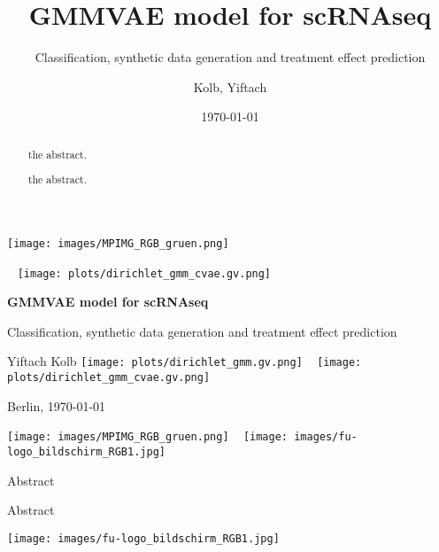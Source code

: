 \documentclass[final]{beamer}
\title{GMMVAE model for scRNAseq}
\subtitle{Classification, synthetic data generation and treatment effect
prediction}
\author{Kolb, Yiftach}
\institute[FU and MPG]{
\centering
\vfill
{\texttt{[image: images/MPIMG\_RGB\_gruen.jpg]}} %
\hspace{0.3cm}
{\texttt{[image: images/fu-logo\_bildschirm\_RGB1.jpg]}}
}
\date{\today}
\begin{document}
\begin{frame}[t]
\begin{center}
\texttt{[image: images/MPIMG\_RGB\_gruen.png]}\\

\begin{block}

~ \texttt{[image: plots/dirichlet\_gmm\_cvae.gv.png]}

\Large
\textbf{GMMVAE model for scRNAseq
}
\vspace{0.5cm}


\large
Classification, synthetic data generation and treatment effect
prediction 

\vspace{1.0cm}

Yiftach Kolb
\texttt{[image: plots/dirichlet\_gmm.gv.png]}
~
\texttt{[image: plots/dirichlet\_gmm\_cvae.gv.png]}

Berlin, \today

\end{block}

\texttt{[image: images/MPIMG\_RGB\_gruen.png]}
~
\texttt{[image: images/fu-logo\_bildschirm\_RGB1.jpg]}
\end{center}

\begin{block}{Abstract}
\begin{abstract}
the abstract.
\end{abstract}
\end{block}
\end{frame}

\begin{frame}[t]
\begin{block}
\maketitle
\end{block}
\begin{block}{Abstract}
\begin{abstract}
the abstract.
\end{abstract}
\end{block}
\begin{block}

\end{block}
\texttt{[image: images/fu-logo\_bildschirm\_RGB1.jpg]}
\begin{block}

\end{block}
\end{frame}
\end{document}
